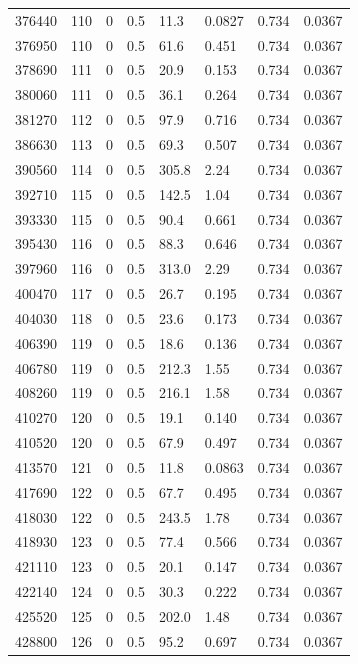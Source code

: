 \documentclass[preview]{standalone}
\begin{document}
{{{{{{{{{\begin{tabular}{L{1.2cm}C{1.2cm} C{0.3cm}C{0.5cm} C{1.4cm}C{1.4cm} C{1.4cm}C{1.4cm}}
  376440  &   110  & 0     & 0.5 &  11.3  & 0.0827  & 0.734 &  0.0367   \\ 
  376950  &   110  & 0     & 0.5 &  61.6  & 0.451  & 0.734 &  0.0367   \\ 
  378690  &   111  & 0     & 0.5 &  20.9  & 0.153  & 0.734 &  0.0367   \\ 
  380060  &   111  & 0     & 0.5 &  36.1  & 0.264  & 0.734 &  0.0367   \\ 
  381270  &   112  & 0     & 0.5 &  97.9  & 0.716  & 0.734 &  0.0367   \\ 
  386630  &   113  & 0     & 0.5 &  69.3  & 0.507  & 0.734 &  0.0367   \\ 
  390560  &   114  & 0     & 0.5 &  305.8  & 2.24  & 0.734 &  0.0367   \\ 
  392710  &   115  & 0     & 0.5 &  142.5  & 1.04  & 0.734 &  0.0367   \\ 
  393330  &   115  & 0     & 0.5 &  90.4  & 0.661  & 0.734 &  0.0367   \\ 
  395430  &   116  & 0     & 0.5 &  88.3  & 0.646  & 0.734 &  0.0367   \\ 
  397960  &   116  & 0     & 0.5 &  313.0  & 2.29  & 0.734 &  0.0367   \\ 
  400470  &   117  & 0     & 0.5 &  26.7  & 0.195  & 0.734 &  0.0367   \\ 
  404030  &   118  & 0     & 0.5 &  23.6  & 0.173  & 0.734 &  0.0367   \\ 
  406390  &   119  & 0     & 0.5 &  18.6  & 0.136  & 0.734 &  0.0367   \\ 
  406780  &   119  & 0     & 0.5 &  212.3  & 1.55  & 0.734 &  0.0367   \\ 
  408260  &   119  & 0     & 0.5 &  216.1  & 1.58  & 0.734 &  0.0367   \\ 
  410270  &   120  & 0     & 0.5 &  19.1  & 0.140  & 0.734 &  0.0367   \\ 
  410520  &   120  & 0     & 0.5 &  67.9  & 0.497  & 0.734 &  0.0367   \\ 
  413570  &   121  & 0     & 0.5 &  11.8  & 0.0863  & 0.734 &  0.0367   \\ 
  417690  &   122  & 0     & 0.5 &  67.7  & 0.495  & 0.734 &  0.0367   \\ 
  418030  &   122  & 0     & 0.5 &  243.5  & 1.78  & 0.734 &  0.0367   \\ 
  418930  &   123  & 0     & 0.5 &  77.4  & 0.566  & 0.734 &  0.0367   \\ 
  421110  &   123  & 0     & 0.5 &  20.1  & 0.147  & 0.734 &  0.0367   \\ 
  422140  &   124  & 0     & 0.5 &  30.3  & 0.222  & 0.734 &  0.0367   \\ 
  425520  &   125  & 0     & 0.5 &  202.0  & 1.48  & 0.734 &  0.0367   \\ 
  428800  &   126  & 0     & 0.5 &  95.2  & 0.697  & 0.734 &  0.0367   \\ 
\hline 
\end{tabular} 

}}}}}}}}}
\end{document}
